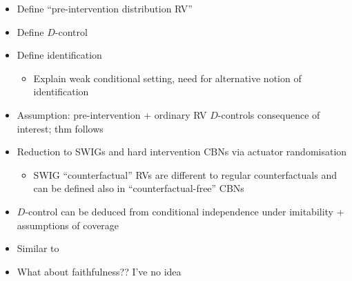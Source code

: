 \begin{itemize}
    \item Define ``pre-intervention distribution RV''
    \item Define $D$-control
    \item Define identification
    \begin{itemize}
        \item Explain weak conditional setting, need for alternative notion of identification
    \end{itemize}
    \item Assumption: pre-intervention + ordinary RV $D$-controls consequence of interest; thm follows
    \item Reduction to SWIGs and hard intervention CBNs via actuator randomisation
    \begin{itemize}
        \item SWIG ``counterfactual'' RVs are different to regular counterfactuals and can be defined also in ``counterfactual-free'' CBNs
    \end{itemize}
\end{itemize}

\begin{itemize}
    \item $D$-control can be deduced from conditional independence under imitability + assumptions of coverage
    \item Similar to \cite{peters_causal_2016}
    \item What about faithfulness?? I've no idea
\end{itemize}
